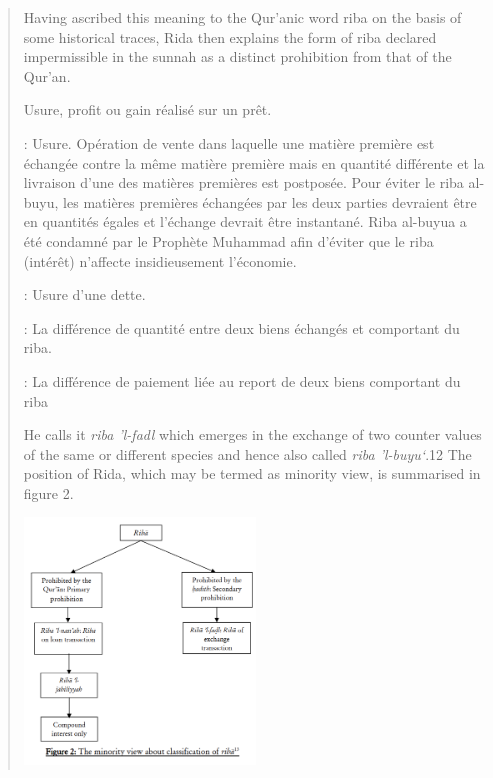 \begin{quote}
Having ascribed this meaning to the Qur'anic word riba on the basis of some historical traces, Rida then explains the form of riba declared impermissible in the sunnah as a distinct prohibition from that of the Qur'an.
\begin{Def}[Riba] Usure, profit ou gain réalisé sur un prêt.
\end{Def}

\begin{Def}
 : Usure. Opération de vente dans laquelle une matière première est échangée contre la même matière première mais en quantité différente et la livraison d’une des matières premières est postposée. Pour éviter le riba al-buyu, les matières premières échangées par les deux parties devraient être en quantités égales et l’échange devrait être instantané. Riba al-buyua a été condamné par le Prophète Muhammad afin d’éviter que le riba (intérêt) n’affecte insidieusement l’économie.
\end{Def}
\begin{Def} : Usure d’une dette.
\end{Def}
 
\begin{Def} : La différence de quantité entre deux biens échangés et comportant du riba.
\end{Def}
\begin{Def} : La différence de paiement liée au report de deux biens comportant du riba
\end{Def} He calls it \textit{riba 'l-fadl} which emerges in the exchange of two counter values of the same or different species and hence also called \textit{riba 'l-buyu‘}.12 The position of Rida, which may be termed as minority view, is summarised in figure 2.


\includegraphics[width=0.5\textwidth]{CourantsIslamContemporain/ImagesCourantsIslamContemporain/RibaRida.png}


\end{quote}
